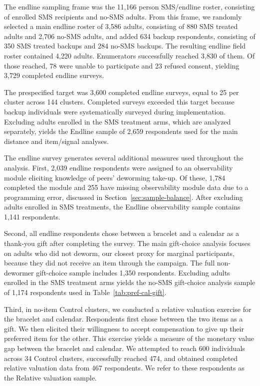 \documentclass[ECM\space ReStud.tex]{subfiles}
\begin{document}
The endline sampling frame was the 11{,}166 person SMS/endline roster, consisting of enrolled SMS recipients and no-SMS adults. From this frame, we randomly selected a main endline roster of 3{,}586 adults, consisting of 880 SMS treated adults and 2{,}706 no-SMS adults, and added 634 backup respondents, consisting of 350 SMS treated backups and 284 no-SMS backups. The resulting endline field roster contained 4{,}220 adults. Enumerators successfully reached 3{,}830 of them. Of those reached, 78 were unable to participate and 23 refused consent, yielding 3{,}729 completed endline surveys.

The prespecified target was 3{,}600 completed endline surveys, equal to 25 per cluster across 144 clusters. Completed surveys exceeded this target because backup individuals were systematically surveyed during implementation. Excluding adults enrolled in the SMS treatment arms, which are analyzed separately, yields the Endline sample of 2{,}659 respondents used for the main distance and item/signal analyses.

The endline survey generates several additional measures used throughout the analysis. First, 2{,}039 endline respondents were assigned to an observability module eliciting knowledge of peers' deworming take-up. Of these, 1{,}784 completed the module and 255 have missing observability module data due to a programming error, discussed in Section~\ref{sec:sample-balance}. After excluding adults enrolled in SMS treatments, the Endline observability sample contains 1{,}141 respondents.

Second, all endline respondents chose between a bracelet and a calendar as a thank-you gift after completing the survey. The main gift-choice analysis focuses on adults who did not deworm, our closest proxy for marginal participants, because they did not receive an item through the campaign. The full non-dewormer gift-choice sample includes 1{,}350 respondents. Excluding adults enrolled in the SMS treatment arms yields the no-SMS gift-choice analysis sample of 1{,}174 respondents used in Table~\ref{tab:pref-cal-gift}.

Third, in no-item Control clusters, we conducted a relative valuation exercise for the bracelet and calendar. Respondents first chose between the two items as a gift. We then elicited their willingness to accept compensation to give up their preferred item for the other. This exercise yields a measure of the monetary value gap between the bracelet and calendar. We attempted to reach 600 individuals across 34 Control clusters, successfully reached 474, and obtained completed relative valuation data from 467 respondents. We refer to these respondents as the Relative valuation sample.
\end{document}
